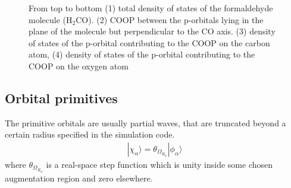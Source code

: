 \documentclass[final,12pt,makeidx,DIV=calc]{article}
\begin{document}
{{{{{{\begin{figure}
\begin{center}
\end{center}
 \caption{From top to bottom (1) total density of states of the 
   formaldehyde molecule (H$_2$CO). (2) COOP between the p-orbitals
   lying in the plane of the molecule but perpendicular to the CO
   axis. (3) density of states of the p-orbital contributing to the
   COOP on the carbon atom, (4) density of states of the p-orbital
   contributing to the COOP on the oxygen atom}
\label{fig:h2copdos}
\end{figure}


\subsection{Orbital primitives}
\label{sec:dostoolorbitalprimitives}
The primitive orbitals are usually partial waves, that are truncated
beyond a certain radius specified in the simulation code.  
\begin{eqnarray}
|\chi_\alpha\rangle=\theta_{\Omega_{R_\alpha}}|\phi_\alpha\rangle
\end{eqnarray}
where $\theta_{\Omega_{R_\alpha}}$ is a real-space step function which is
unity inside some chosen augmentation region and zero elsewhere.  

}}}}}}
\end{document}
